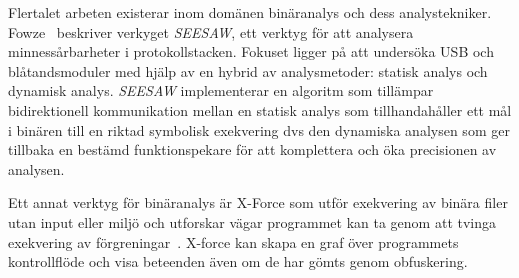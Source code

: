 Flertalet arbeten existerar inom domänen binäranalys och dess analystekniker.
Fowze~\cite{fowze_mem_vul} beskriver verkyget \emph{SEESAW}, ett verktyg för
att analysera minnessårbarheter i protokollstacken. Fokuset ligger på att
undersöka USB och blåtandsmoduler med hjälp av en hybrid av analysmetoder:
statisk analys och dynamisk analys. \emph{SEESAW} implementerar en algoritm som
tillämpar bidirektionell kommunikation mellan en statisk analys som
tillhandahåller ett mål i binären till en riktad symbolisk exekvering dvs den
dynamiska analysen som ger tillbaka en bestämd funktionspekare för att
komplettera och öka precisionen av analysen.

Ett annat verktyg för binäranalys är X-Force som utför exekvering av binära
filer utan input eller miljö och utforskar vägar programmet kan ta genom att
tvinga exekvering av förgreningar~\cite{xforce}. X-force kan skapa en graf över
programmets kontrollflöde och visa beteenden även om de har gömts genom
obfuskering.

